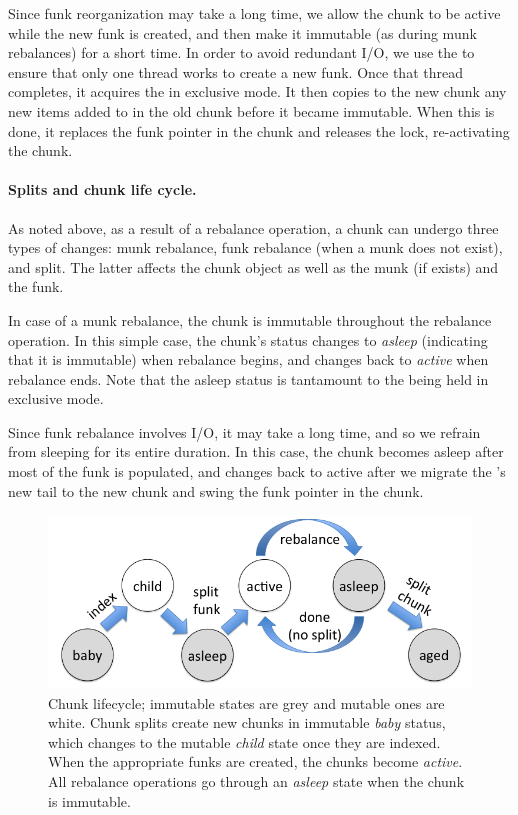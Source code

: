Since funk reorganization may take a long time, we allow the chunk to be active while the new funk is created,
and then make it immutable (as during munk rebalances) for a short time. In order to avoid redundant I/O, 
we use the  to ensure that only one thread works to create a new funk.  Once that thread
completes, it acquires the  in exclusive mode.
It then copies to the new chunk any new items added to   in the old chunk before it became immutable. 
When this is done, it replaces the funk pointer in the chunk and releases the lock, re-activating the chunk.

\paragraph{Splits and chunk life cycle.}

As noted above, as a result of a rebalance operation, a chunk can undergo three types of changes: munk rebalance, funk rebalance
(when a munk does not exist), and split. The latter affects the chunk object as well as the munk (if exists) and the funk.

In case of a munk rebalance, the chunk is immutable throughout the rebalance operation.
In this simple case, the chunk's status changes to \emph{asleep} (indicating that it is immutable)
when rebalance begins, and changes back to \emph{active} when rebalance ends. 
Note that the asleep status is tantamount to the  being held in exclusive mode.

Since funk rebalance involves I/O, it may take a long time, and so we  refrain from sleeping for its entire 
duration. In this case, the chunk becomes asleep after most of the funk is populated, and 
changes back to active after we 
migrate the 's new tail to the new chunk and swing the funk pointer in the chunk.


\begin{figure}[htb]
\centerline{
\includegraphics[width=\columnwidth]{state-diagram.png}
}
\caption{Chunk lifecycle; immutable states are grey and mutable ones are white.
Chunk splits  create new chunks in immutable \emph{baby} status, which changes to the mutable \emph{child} state once they 
are indexed. When the appropriate funks are created, the chunks become \emph{active}. All rebalance operations go through an 
\emph{asleep} state when the chunk is immutable.}
\label{fig:status}
\end{figure}


